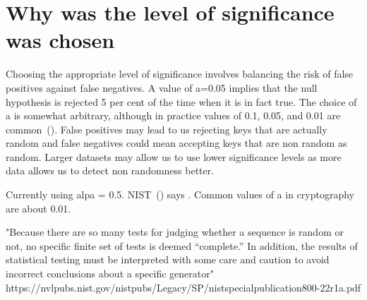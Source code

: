 \section{Why was the level of significance was chosen}
\label{sec:Pvalue}

Choosing the appropriate level of significance involves balancing the risk of false positives against false negatives.  A value of a=0.05 implies that the null hypothesis is rejected 5 per cent of the time when it is in fact true. The choice of a is somewhat arbitrary, although in practice values of 0.1, 0.05, and 0.01 are common~(\cite{nist}). False positives may lead to us rejecting keys that are actually random and false negatives could mean accepting keys that are non random as random. Larger datasets may allow us to use lower significance levels as more data allows us to detect non randomness better. \par
Currently using alpa = 0.5. NIST~(\cite{1195701}) says . Common values of a in cryptography are about 0.01. 

"Because there are so many 
tests for judging whether a sequence is random or not, no specific finite set of tests is deemed “complete.” 
In addition, the results of statistical testing must be interpreted with some care and caution to avoid 
incorrect conclusions about a specific generator" https://nvlpubs.nist.gov/nistpubs/Legacy/SP/nistspecialpublication800-22r1a.pdf